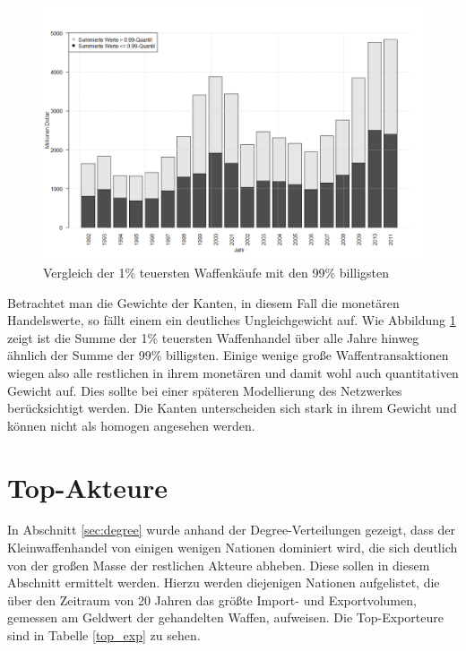 \documentclass[a4paper,ngerman,oneside,titlepage,bibliography=totoc,11pt]{scrreprt}
\begin{document}
\begin{figure}[h]
	\centering
		\includegraphics[width=1.00\textwidth]{Grafiken/ts_value.png}
	\caption{Vergleich der 1\% teuersten Waffenkäufe mit den 99\% billigsten}
	\label{fig:ts_value}
\end{figure}

Betrachtet man die Gewichte der Kanten, in diesem Fall die monetären Handelswerte, so fällt einem ein deutliches Ungleichgewicht auf. Wie Abbildung \ref{fig:ts_value} zeigt ist die Summe der 1\% teuersten Waffenhandel über alle Jahre hinweg ähnlich der Summe der 99\% billigsten. Einige wenige große Waffentransaktionen wiegen also alle restlichen in ihrem monetären und damit wohl auch quantitativen Gewicht auf. Dies sollte bei einer späteren Modellierung des Netzwerkes berücksichtigt werden. Die Kanten unterscheiden sich stark in ihrem Gewicht und können nicht als homogen angesehen werden.

\section{Top-Akteure}
\label{sec:top-akteure}
In Abschnitt \ref{sec:degree} wurde anhand der Degree-Verteilungen gezeigt, dass der Kleinwaffenhandel von einigen wenigen Nationen dominiert wird, die sich deutlich von der großen Masse der restlichen Akteure abheben. Diese sollen in diesem Abschnitt ermittelt werden. Hierzu werden diejenigen Nationen aufgelistet, die über den Zeitraum von 20 Jahren das größte Import- und Exportvolumen, gemessen am Geldwert der gehandelten Waffen, aufweisen. Die Top-Exporteure sind in Tabelle \ref{top_exp} zu sehen.
\end{document}
